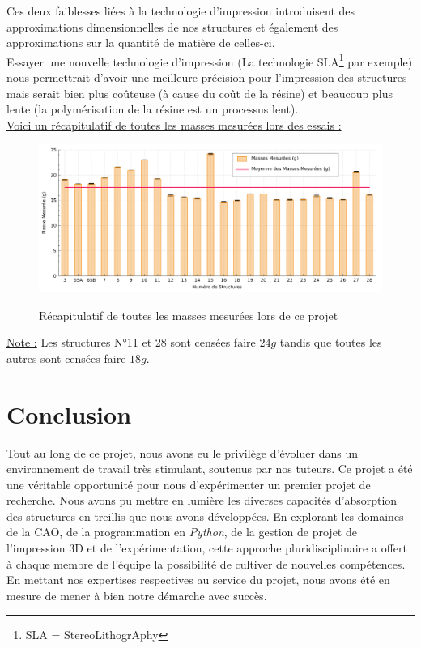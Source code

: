 \documentclass[a4paper]{article}
\begin{document}
	Ces deux faiblesses liées à la technologie d'impression introduisent des approximations dimensionnelles de nos structures et également des approximations sur la quantité de matière de celles-ci.\\
	
	Essayer une nouvelle technologie d'impression (La technologie SLA\footnote{SLA = StereoLithogrAphy} par exemple) nous permettrait d'avoir une meilleure précision pour l'impression des structures mais serait bien plus coûteuse (à cause du coût de la résine) et beaucoup plus lente (la polymérisation de la résine est un processus lent).\\
	
	\underline{Voici un récapitulatif de toutes les masses mesurées lors des essais :}
	
	\begin{figure}[H]
		\centering
		\includegraphics[width=16cm]{Images/9/masses_mesurees.pdf}\\
		\caption{Récapitulatif de toutes les masses mesurées lors de ce projet}
	\end{figure}

	\underline{Note :} Les structures N°11 et 28 sont censées faire $24 g$ tandis que toutes les autres sont censées faire $18 g$.
	\newpage
	
	\section{Conclusion}
	\hspace{0.5cm}Tout au long de ce projet, nous avons eu le privilège d'évoluer dans un environnement de travail très stimulant, soutenus par nos tuteurs. Ce projet a été une véritable opportunité pour nous d'expérimenter un premier projet de recherche. Nous avons pu mettre en lumière les diverses capacités d'absorption des structures en treillis que nous avons développées. En explorant les domaines de la CAO, de la programmation en \textit{Python}, de la gestion de projet de l'impression 3D et de l'expérimentation, cette approche pluridisciplinaire a offert à chaque membre de l'équipe la possibilité de cultiver de nouvelles compétences. En mettant nos expertises respectives au service du projet, nous avons été en mesure de mener à bien notre démarche avec succès.\\
	
\end{document}
